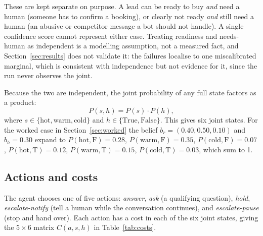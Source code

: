 \documentclass{article}
\begin{document}
These are kept separate on purpose. A lead can be ready to buy \emph{and} need
a human (someone has to confirm a booking), or clearly not ready \emph{and}
still need a human (an abusive or competitor message a bot should not handle).
A single confidence score cannot represent either case. Treating readiness and
needs-human as independent is a modelling assumption, not a measured fact, and
Section~\ref{sec:results} does not validate it: the failures localise to one
miscalibrated marginal, which is consistent with independence but not evidence for
it, since the run never observes the joint.

Because the two are independent, the joint probability of any full state
factors as a product:
\begin{equation}
P(s, h) = P(s) \cdot P(h),
\end{equation}
where $s \in \{\text{hot}, \text{warm}, \text{cold}\}$ and
$h \in \{\text{True}, \text{False}\}$.
This gives six joint states. For the worked case in
Section~\ref{sec:worked} the belief $b_r = (0.40, 0.50, 0.10)$ and
$b_h = 0.30$ expand to $P(\text{hot},\text{F}) = 0.28$,
$P(\text{warm},\text{F}) = 0.35$, $P(\text{cold},\text{F}) = 0.07$,
$P(\text{hot},\text{T}) = 0.12$, $P(\text{warm},\text{T}) = 0.15$,
$P(\text{cold},\text{T}) = 0.03$, which sum to 1.

\subsection{Actions and costs}
The agent chooses one of five actions: \emph{answer}, \emph{ask} (a qualifying
question), \emph{hold}, \emph{escalate-notify} (tell a human while the
conversation continues), and \emph{escalate-pause} (stop and hand over). Each
action has a cost in each of the six joint states, giving the $5 \times 6$
matrix $C(a, s, h)$ in Table~\ref{tab:costs}.
\end{document}
